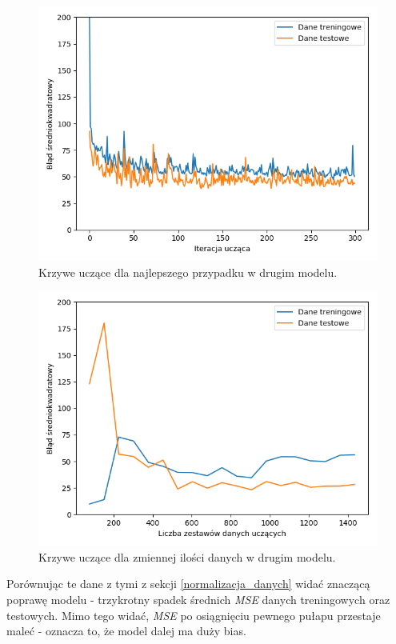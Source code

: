 \documentclass[12pt]{aghdpl}
\newenvironment{tightcenter}{
  \setlength\topsep{0pt}
  \setlength\parskip{0pt}
  \begin{center}
}{
  \end{center}
}
\begin{document}
		\begin{figure}[h]
			\begin{tightcenter}
	 			\includegraphics[width = 0.75\linewidth]{wykresy/3_drugi_model_tworzenie_i_analiza/wykres_uczenia.png}
	 		\end{tightcenter}
	 		
 			\caption{Krzywe uczące dla najlepszego przypadku w drugim modelu.}
			\label{fig: drugi_model_wykres_uczenia}
		\end{figure}
		
		\begin{figure}[h]
			\begin{tightcenter}
	 			\includegraphics[width = 0.75\linewidth]{wykresy/3_drugi_model_tworzenie_i_analiza/learning_curves.png}
	 		\end{tightcenter}
	 		
 			\caption{Krzywe uczące dla zmiennej ilości danych w drugim modelu.}
			\label{fig: drugi_model_learning_curves}
		\end{figure}
		
		Porównując te dane z tymi z sekcji \ref{normalizacja_danych} widać znaczącą poprawę modelu - trzykrotny spadek średnich \textit{MSE} danych treningowych oraz testowych. Mimo tego widać, \textit{MSE} po osiągnięciu pewnego pułapu przestaje maleć - oznacza to, że model dalej ma duży bias.
		
\end{document}
